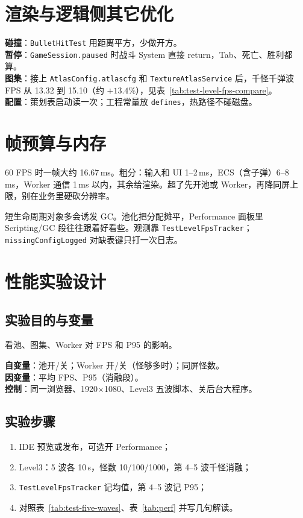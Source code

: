 \section{渲染与逻辑侧其它优化}

\textbf{碰撞}：\texttt{BulletHitTest} 用距离平方，少做开方。\\
\textbf{暂停}：\texttt{GameSession.paused} 时战斗 System 直接 return，Tab、死亡、胜利都算。\\
\textbf{图集}：接上 \texttt{AtlasConfig.atlascfg} 和 \texttt{TextureAtlasService} 后，千怪千弹波 FPS 从 13.32 到 15.10（约 $+13.4\%$），见表~\ref{tab:test-level-fps-compare}。\\
\textbf{配置}：策划表启动读一次；工程常量放 \texttt{defines}，热路径不碰磁盘。

\section{帧预算与内存}

60 FPS 时一帧大约 16.67\,ms。粗分：输入和 UI 1--2\,ms，ECS（含子弹）6--8\,ms，Worker 通信 1\,ms 以内，其余给渲染\cite{gregory2018game}。超了先开池或 Worker，再降同屏上限，别在业务里硬砍分辨率。

短生命周期对象多会诱发 GC。池化把分配摊平，Performance 面板里 Scripting/GC 段往往跟着好看些。观测靠 \texttt{TestLevelFpsTracker}；\texttt{missingConfigLogged} 对缺表键只打一次日志。

\section{性能实验设计}

\subsection{实验目的与变量}

看池、图集、Worker 对 FPS 和 P95 的影响\cite{gregory2018game,mckenzie2008crowd}。

\textbf{自变量}：池开/关；Worker 开/关（怪够多时）；同屏怪数。\\
\textbf{因变量}：平均 FPS、P95（消融段）。\\
\textbf{控制}：同一浏览器、1920$\times$1080、Level3 五波脚本、关后台大程序。

\subsection{实验步骤}

\begin{enumerate}[label=\arabic*.]
  \item IDE 预览或发布，可选开 Performance；
  \item Level3：5 波各 10\,s，怪数 10/100/1000，第 4--5 波千怪消融；
  \item \texttt{TestLevelFpsTracker} 记均值，第 4--5 波记 P95；
  \item 对照表~\ref{tab:test-five-waves}、表~\ref{tab:perf} 并写几句解读。
\end{enumerate}

